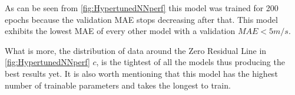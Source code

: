 As can be seen from \autoref{fig:HypertunedNNperf} this model was trained for 200 epochs
because the validation MAE stops decreasing after that. This model
exhibits the lowest MAE of every other model with a validation
\(MAE < 5 m/s\).

What is more, the distribution of data around the Zero Residual Line in
\autoref{fig:HypertunedNNperf} $c$, is the tightest of all the models thus producing the best
results yet. It is also worth mentioning that this model has the highest
number of trainable parameters and takes the longest to train.
